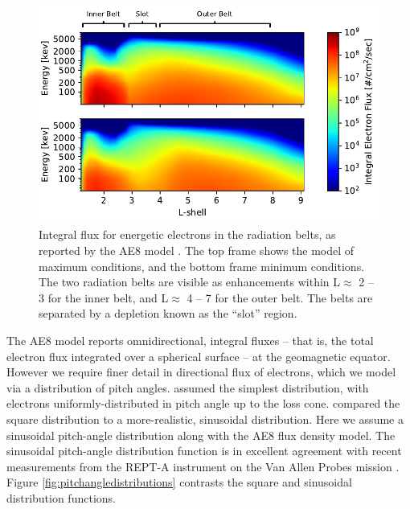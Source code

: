 \begin{figure}
\begin{center}
\includegraphics{figures/AE8_fluxes.pdf}
\caption[AE8 integral flux model]{Integral flux for energetic electrons in the radiation belts, as reported by the AE8 model \citep{Vette1991}. The top frame shows the model of maximum conditions, and the bottom frame minimum conditions. The two radiation belts are visible as enhancements within L$\approx$ 2 -- 3 for the inner belt, and L$\approx$ 4 -- 7 for the outer belt. The belts are separated by a depletion known as the ``slot'' region.}
\label{fig:AE8_model}
\end{center}
\end{figure}

The AE8 model reports omnidirectional, integral fluxes -- that is, the total electron flux integrated over a spherical surface -- at the geomagnetic equator. However we require finer detail in directional flux of electrons, which we model via a distribution of pitch angles. \cite{Lauben1998} assumed the simplest distribution, with electrons uniformly-distributed in pitch angle up to the loss cone. \cite{Bortnik2005} compared the square distribution to a more-realistic, sinusoidal distribution. Here we assume a sinusoidal pitch-angle distribution along with the AE8 flux density model. The sinusoidal pitch-angle distribution function is in excellent agreement with recent measurements from the REPT-A instrument on the Van Allen Probes mission \citep{Baker2014}. Figure \ref{fig:pitchangledistributions} contrasts the square and sinusoidal distribution functions.


